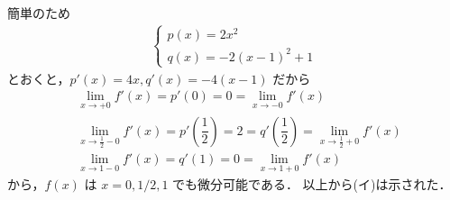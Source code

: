 \documentclass[../../main.tex]{subfiles}
\begin{document}
簡単のため
\begin{align}
  \begin{cases}
    p(x) = 2x^2 \\
    q(x) = -2(x-1)^2 + 1
  \end{cases}
\end{align}
とおくと，$p'(x) = 4x, q'(x) = -4(x-1)$ だから
\begin{align}
  & \lim_{x \to +0} f'(x) = p'(0) = 0 = \lim_{x \to -0} f'(x) \\
  & \lim_{x \to \frac{1}{2} - 0} f'(x) = p'\left(\dfrac{1}{2}\right) = 2 = q'\left(\dfrac{1}{2}\right) = \lim_{x \to \frac{1}{2} + 0} f'(x) \\
  & \lim_{x \to 1 - 0} f'(x) = q'(1) = 0 = \lim_{x \to 1 + 0} f'(x)
\end{align}
から，$f(x)$ は $x = 0, 1/2, 1$ でも微分可能である．
以上から(イ)は示された．

\newpage
\end{document}

